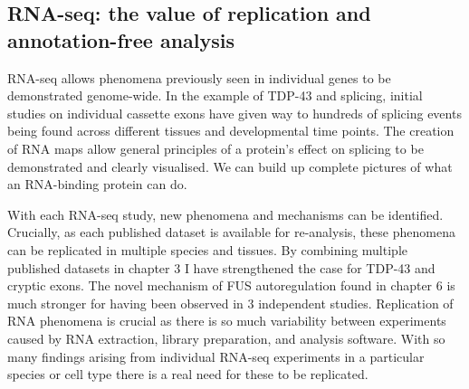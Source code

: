 





\subsection{RNA-seq: the value of replication and annotation-free analysis}

RNA-seq allows phenomena previously seen in individual genes to be demonstrated genome-wide.
In the example of TDP-43 and splicing, initial studies on individual cassette exons have given way to hundreds of splicing events being found across different tissues and developmental time points.
The creation of RNA maps allow general principles of a protein's effect on splicing to be demonstrated and clearly visualised.
We can build up complete pictures of what an RNA-binding protein can do.

With each RNA-seq study, new phenomena and mechanisms can be identified.
Crucially, as each published dataset is available for re-analysis, these phenomena can be replicated in multiple species and tissues.
By combining multiple published datasets in chapter 3 I have strengthened the case for TDP-43 and cryptic exons.
The novel mechanism of FUS autoregulation found in chapter 6 is much stronger for having been observed in 3 independent studies.
Replication of RNA phenomena is crucial as there is so much variability between experiments caused by RNA extraction, library preparation, and analysis software.
With so many findings arising from individual RNA-seq experiments in a particular species or cell type there is a real need for these to be replicated.

